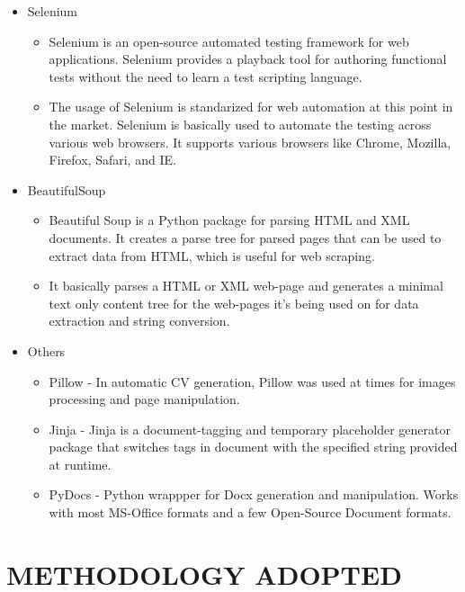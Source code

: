 \documentclass[14pt]{extarticle}
\begin{document}
\begin{itemize}
\begin{itemize}
    \end{itemize}
    \item Selenium
     \begin{itemize}
        \item \par Selenium is an open-source automated testing framework for web applications. Selenium provides a playback tool for authoring functional tests without the need to learn a test scripting language.
        \item \par The usage of Selenium is standarized for web automation at this point in the market. Selenium is basically used to automate the testing across various web browsers. It supports various browsers like Chrome, Mozilla, Firefox, Safari, and IE.
    \end{itemize}
    \item BeautifulSoup
    \begin{itemize}
        \item Beautiful Soup is a Python package for parsing HTML and XML documents. It creates a parse tree for parsed pages that can be used to extract data from HTML, which is useful for web scraping.
        \item It basically parses a HTML or XML web-page and generates a minimal text only content tree for the web-pages it's being used on for data extraction and string conversion.
    \end{itemize}
    \item Others
    \begin{itemize}
        \item Pillow - In automatic CV generation, Pillow was used at times for images processing and page manipulation.
        \item Jinja - Jinja is a document-tagging and temporary placeholder generator package that switches tags in document with the specified string provided at runtime.
        \item PyDocs - Python wrappper for Docx generation and manipulation. Works with most MS-Office formats and a few Open-Source Document formats.
    \end{itemize}
\end{itemize}

\newpage
\section{METHODOLOGY ADOPTED}


\newpage
\end{document}
